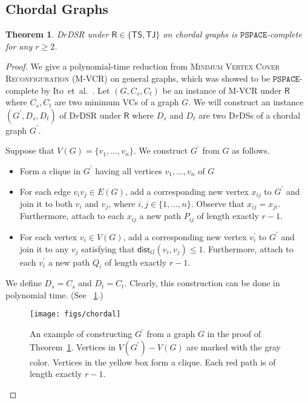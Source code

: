 \documentclass[a4paper]{article}
\theoremstyle{plain}
\newtheorem{theorem}{Theorem}
\theoremstyle{definition}
\newcommand{\sfTS}{{\mathsf{TS}}} %
\newcommand{\sfTJ}{{\mathsf{TJ}}} %
\newcommand{\sfR}{{\mathsf{R}}} %
\newcommand{\ttPSPACE}{{\mathtt{PSPACE}}}
\newcommand{\dist}{\mathsf{dist}} %
\begin{document}
\subsection{Chordal Graphs}
\label{sec:chordal}
\begin{theorem}\label{thm:chordal}
	\textsc{D$r$DSR} under $\sfR \in \{\sfTS, \sfTJ\}$ on chordal graphs is $\ttPSPACE$-complete for any $r \geq 2$.
\end{theorem}
\begin{proof}
	We give a polynomial-time reduction from \textsc{Minimum Vertex Cover Reconfiguration (M-VCR)} on general graphs, which was showed to be $\ttPSPACE$-complete by Ito~et~al.~\cite{ItoDHPSUU11}.
	Let $(G, C_s, C_t)$ be an instance of \textsc{M-VCR} under $\sfR$ where $C_s, C_t$ are two minimum VCs of a graph $G$.
	We will construct an instance $(G^\prime, D_s, D_t)$ of \textsc{D$r$DSR} under $\sfR$ where $D_s$ and $D_t$ are two D$r$DSs of a chordal graph $G^\prime$.
	
	Suppose that $V(G) = \{v_1, \dots, v_n\}$.
	We construct $G^\prime$ from $G$ as follows.
	\begin{itemize}
		\item Form a clique in $G^\prime$ having all vertices $v_1, \dots, v_n$ of $G$
		\item For each edge $v_iv_j \in E(G)$, add a corresponding new vertex $x_{ij}$ to $G^\prime$ and join it to both $v_i$ and $v_j$, where $i, j \in \{1, \dots, n\}$.
		Observe that $x_{ij} = x_{ji}$.
		Furthermore, attach to each $x_{ij}$ a new path $P_{ij}$ of length exactly $r-1$. 
		\item For each vertex $v_i \in V(G)$, add a corresponding new vertex $v^\prime_i$ to $G^\prime$ and join it to any $v_j$ satisfying that $\dist_G(v_i, v_j) \leq 1$.
		Furthermore, attach to each $v_i^\prime$ a new path $Q_i$ of length exactly $r-1$. 
	\end{itemize}
	We define $D_s = C_s$ and $D_t = C_t$. 
	Clearly, this construction can be done in polynomial time.
	(See \figurename~\ref{fig:chordal}.)
	
	\begin{figure}[ht]
		\centering
		\texttt{[image: figs/chordal]}
		\caption{An example of constructing $G^\prime$ from a graph $G$ in the proof of Theorem~\ref{thm:chordal}. Vertices in $V(G^\prime) - V(G)$ are marked with the gray color. Vertices in the yellow box form a clique. Each red path is of length exactly $r-1$.}
		\label{fig:chordal}
	\end{figure}
	

\end{proof}
\end{document}
